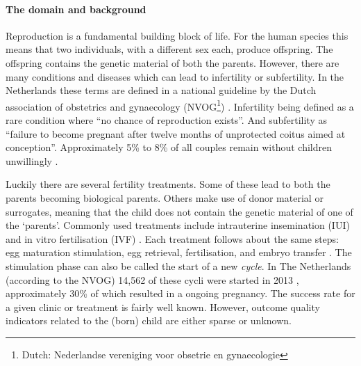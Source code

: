 \paragraph{The domain and background}
Reproduction is a fundamental building block of life.
For the human species this means that two individuals, with a different sex each, produce offspring.
The offspring contains the genetic material of both the parents.
However, there are many conditions and diseases which can lead to infertility or subfertility.
In the Netherlands these terms are defined in a national guideline by the Dutch association of obstetrics and gynaecology (NVOG\footnote{Dutch: Nederlandse vereniging voor obsetrie en gynaecologie}) \cite{subfertilityGuideline}.
Infertility being defined as a rare condition where ``no chance of reproduction exists''.
And subfertility as ``failure to become pregnant after twelve months of unprotected coitus aimed at conception''.
Approximately 5\% to 8\% of all couples remain without children unwillingly \cite{cbsStatistics, nhgStatistics}.

Luckily there are several fertility treatments.
Some of these lead to both the parents becoming biological parents. 
Others make use of donor material or surrogates, meaning that the child does not contain the genetic material of one of the `parents'.
Commonly used treatments include intrauterine insemination (IUI) and in vitro fertilisation (IVF) \cite{treatmentExplanation}.
Each treatment follows about the same steps: egg maturation stimulation, egg retrieval, fertilisation, and embryo transfer \cite{treatmentExplanation}.
The stimulation phase can also be called the start of a new \emph{cycle}. In The Netherlands (according to the NVOG) 14,562 of these cycli were started in 2013 \cite{ivfReportNVOG2013}, approximately 30\% of which resulted in a ongoing pregnancy.
The success rate for a given clinic or treatment is fairly well known.
However, outcome quality indicators related to the (born) child are either sparse or unknown.

